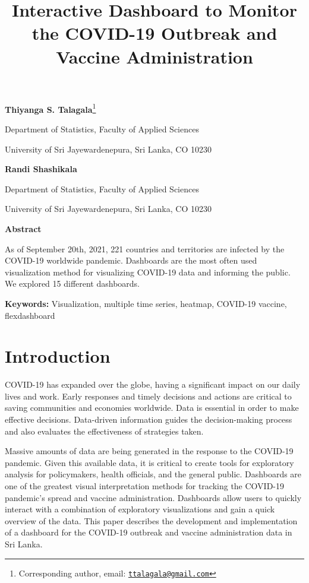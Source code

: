 \documentclass[
]{article}
\title{Interactive Dashboard to Monitor the COVID-19 Outbreak and
Vaccine Administration}
\author{}
\date{\vspace{-2.5em}}
\begin{document}
\maketitle

\textbf{Thiyanga S. Talagala}\footnote{Corresponding author, email:
  \href{mailto:ttalagala@gmail.com}{\nolinkurl{ttalagala@gmail.com}}}

Department of Statistics, Faculty of Applied Sciences

University of Sri Jayewardenepura, Sri Lanka, CO 10230

\hspace{3cm}

\textbf{Randi Shashikala}

Department of Statistics, Faculty of Applied Sciences

University of Sri Jayewardenepura, Sri Lanka, CO 10230

\hspace{3cm}

\textbf{Abstract}

As of September 20th, 2021, 221 countries and territories are infected
by the COVID-19 worldwide pandemic. Dashboards are the most often used
visualization method for visualizing COVID-19 data and informing the
public. We explored 15 different dashboards.

\textbf{Keywords:} Visualization, multiple time series, heatmap,
COVID-19 vaccine, flexdashboard

\hypertarget{introduction}{%
\section{Introduction}\label{introduction}}

COVID-19 has expanded over the globe, having a significant impact on our
daily lives and work. Early responses and timely decisions and actions
are critical to saving communities and economies worldwide. Data is
essential in order to make effective decisions. Data-driven information
guides the decision-making process and also evaluates the effectiveness
of strategies taken.

Massive amounts of data are being generated in the response to the
COVID-19 pandemic. Given this available data, it is critical to create
tools for exploratory analysis for policymakers, health officials, and
the general public. Dashboards are one of the greatest visual
interpretation methods for tracking the COVID-19 pandemic's spread and
vaccine administration. Dashboards allow users to quickly interact with
a combination of exploratory visualizations and gain a quick overview of
the data. This paper describes the development and implementation of a
dashboard for the COVID-19 outbreak and vaccine administration data in
Sri Lanka.
\end{document}
